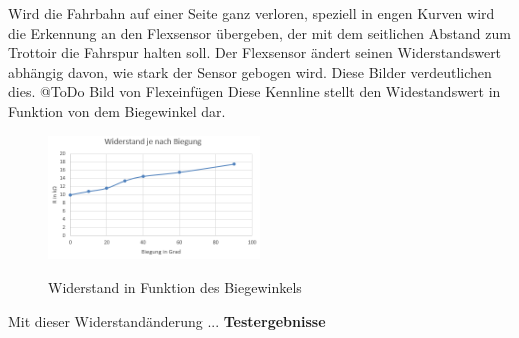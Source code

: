 Wird die Fahrbahn auf einer Seite ganz verloren, speziell in engen Kurven wird die Erkennung an den Flexsensor übergeben, der mit dem seitlichen Abstand zum Trottoir die Fahrspur halten soll.
Der Flexsensor ändert seinen Widerstandswert abhängig davon, wie stark der Sensor gebogen wird. Diese Bilder verdeutlichen dies.
@ToDo Bild von Flexeinfügen
Diese Kennline stellt den Widestandswert in Funktion von dem Biegewinkel dar.

\begin{figure}[h]
	\centering
	\includegraphics[width=0.5\textwidth]{03_Loesungskonzept/pictures/Flex_Biegungskennline.png}
	\label{fig:Flex_R_Kennlinie}
	\caption{Widerstand in Funktion des Biegewinkels}
\end{figure}

Mit dieser Widerstandänderung ...
\textbf{Testergebnisse}\\